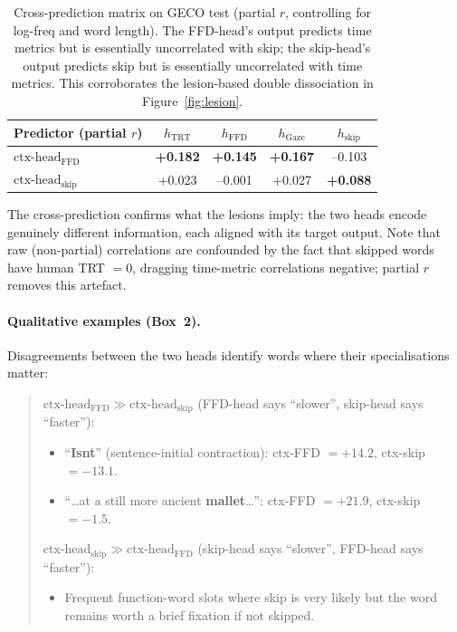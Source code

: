 \documentclass[11pt]{article}
\begin{document}
\begin{table}[h]
\centering
\small
\begin{tabular}{lcccc}
\toprule
\textbf{Predictor (partial $r$)} & $h_{\text{TRT}}$ & $h_{\text{FFD}}$ & $h_{\text{Gaze}}$ & $h_{\text{skip}}$ \\
\midrule
$\mathrm{ctx\text{-}head}_{\text{FFD}}$  & \textbf{+0.182} & \textbf{+0.145} & \textbf{+0.167} & --0.103 \\
$\mathrm{ctx\text{-}head}_{\text{skip}}$ & +0.023 & --0.001 & +0.027 & \textbf{+0.088} \\
\bottomrule
\end{tabular}
\caption{Cross-prediction matrix on GECO test (partial $r$, controlling for log-freq and word length). The FFD-head's output predicts time metrics but is essentially uncorrelated with skip; the skip-head's output predicts skip but is essentially uncorrelated with time metrics. This corroborates the lesion-based double dissociation in Figure~\ref{fig:lesion}.}
\label{tab:xpred}
\end{table}

The cross-prediction confirms what the lesions imply: the two heads encode genuinely different information, each aligned with its target output. Note that raw (non-partial) correlations are confounded by the fact that skipped words have human TRT $= 0$, dragging time-metric correlations negative; partial $r$ removes this artefact.

\paragraph{Qualitative examples (Box~2).} Disagreements between the two heads identify words where their specialisations matter:

\begin{quote}\small
\textbf{$\mathrm{ctx\text{-}head}_{\text{FFD}} \gg \mathrm{ctx\text{-}head}_{\text{skip}}$} (FFD-head says ``slower'', skip-head says ``faster''):
\begin{itemize}\setlength\itemsep{-2pt}
\item ``\textbf{Isnt}'' (sentence-initial contraction): ctx-FFD $= +14.2$, ctx-skip $= -13.1$.
\item ``\dots at a still more ancient \textbf{mallet}\dots'': ctx-FFD $= +21.9$, ctx-skip $= -1.5$.
\end{itemize}

\textbf{$\mathrm{ctx\text{-}head}_{\text{skip}} \gg \mathrm{ctx\text{-}head}_{\text{FFD}}$} (skip-head says ``slower'', FFD-head says ``faster''):
\begin{itemize}\setlength\itemsep{-2pt}
\item Frequent function-word slots where skip is very likely but the word remains worth a brief fixation if not skipped.
\end{itemize}
\end{quote}
\end{document}

